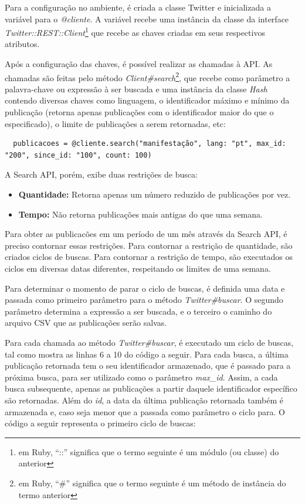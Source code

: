 Para a configuração no ambiente, é criada a classe Twitter e inicializada a variável para o \textit{@cliente}. A variável recebe uma instância da classe da interface \textit{Twitter::REST::Client}\footnote{em Ruby, ``::'' significa que o termo seguinte é um módulo (ou classe) do anterior} que recebe as chaves criadas em seus respectivos atributos.

Após a configuração das chaves, é possível realizar as chamadas à API. As chamadas são feitas pelo método \textit{Client\#search}\footnote{em Ruby, ``\#'' significa que o termo seguinte é um método de instância do termo anterior}, que recebe como parâmetro a palavra-chave ou expressão à ser buscada e uma instância da classe \textit{Hash} contendo diversas chaves como linguagem, o identificador máximo e mínimo da publicação (retorna apenas publicações com o identificador maior do que o especificado), o limite de publicações a serem retornadas, etc:

\begin{lstlisting}
  publicacoes = @cliente.search("manifestação", lang: "pt", max_id: "200", since_id: "100", count: 100)
\end{lstlisting}

A Search API, porém, exibe duas restrições de busca:

\begin{itemize}
  \item \textbf{Quantidade:} Retorna apenas um número reduzido de publicações por vez.
  \item \textbf{Tempo:} Não retorna publicações mais antigas do que uma semana.
\end{itemize}

Para obter as publicacões em um período de um mês através da Search API, é preciso contornar essas restrições. Para contornar a restrição de quantidade, são criados ciclos de buscas. Para contornar a restrição de tempo, são executados os ciclos em diversas datas diferentes, respeitando os limites de uma semana.

Para determinar o momento de parar o ciclo de buscas, é definida uma data e passada como primeiro parâmetro para o método \textit{Twitter\#buscar}. O segundo parâmetro determina a expressão a ser buscada, e o terceiro o caminho do arquivo CSV que as publicações serão salvas. 

Para cada chamada ao método \textit{Twitter\#buscar}, é executado um ciclo de buscas, tal como mostra as linhas 6 a 10 do código a seguir. Para cada busca, a última publicação retornada tem o seu identificador armazenado, que é passado para a próxima busca, para ser utilizado como o parâmetro \textit{max\_id}. Assim, a cada busca subsequente, apenas as publicações a partir daquele identificador específico são retornadas. Além do \textit{id}, a data da última publicação retornada também é armazenada e, caso seja menor que a passada como parâmetro o ciclo para. O código a seguir representa o primeiro ciclo de buscas:

